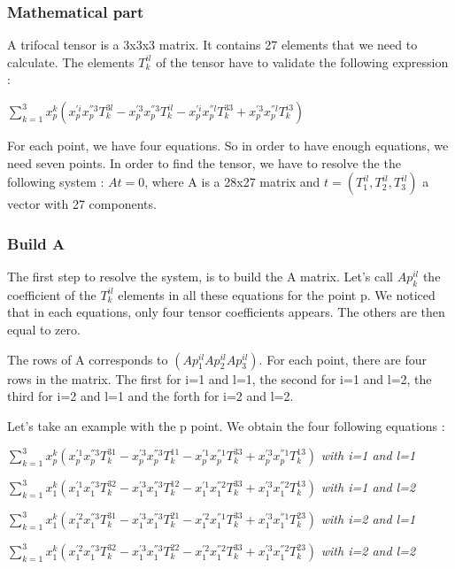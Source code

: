 \documentclass{report}
\begin{document}
\subsubsection{Mathematical part}
A trifocal tensor is a 3x3x3 matrix. It contains 27 elements that we need to calculate. The elements $T_{k}^{il}$ of the tensor have to validate the following expression : 
\begin{center}
 $ \displaystyle { \sum_{k = 1}^{3}} x_{p}^{k}(x_{p}^{'i}x_{p}^{''3}T_{k}^{3l} - x_{p}^{'3}x_{p}^{''3}T_{k}^{il} - x_{p}^{'i}x_{p}^{''l}T_{k}^{33} + x_{p}^{'3}x_{p}^{''l}T_{k}^{i3})$ 
\end{center}
For each point, we have four equations. So in order to have enough equations, we need seven points. 
In order to find the tensor, we have to resolve the the following system : $At = 0$, where A is a 28x27 matrix and $t = ( T_{1}^{il}, T_{2}^{il}, T_{3}^{il})$ a vector with 27 components.

\subsubsection{Build A}
The first step to resolve the system, is to build the A matrix. Let's call $Ap_{k}^{il}$ the coefficient of the $T_{k}^{il}$ elements in all these equations for the point p. We noticed that in each equations, only four tensor coefficients appears. The others are then equal to zero. 

The rows of A corresponds to $( Ap_{1}^{il}  Ap_{2}^{il}  Ap_{3}^{il} )$.
For each point, there are four rows in the matrix. The first for i=1 and l=1, the second for i=1 and l=2, the third for i=2 and l=1 and the forth for i=2 and l=2.


Let's take an example with the p point. 
We obtain the four following equations : 
\begin{center}
 $ \displaystyle { \sum_{k = 1}^{3}} x_{p}^{k}(x_{p}^{'1}x_{p}^{''3}T_{k}^{31} - x_{p}^{'3}x_{p}^{''3}T_{k}^{11} - x_{p}^{'1}x_{p}^{''1}T_{k}^{33} + x_{p}^{'3}x_{p}^{''1}T_{k}^{13})$  \textit{with i=1 and l=1}
\end{center}
\begin{center}
 $ \displaystyle { \sum_{k = 1}^{3}} x_{1}^{k}(x_{1}^{'1}x_{1}^{''3}T_{k}^{32} - x_{1}^{'3}x_{1}^{''3}T_{k}^{12} - x_{1}^{'1}x_{1}^{''2}T_{k}^{33} + x_{1}^{'3}x_{1}^{''2}T_{k}^{13})$  \textit{with i=1 and l=2} 
\end{center}
\begin{center}
 $ \displaystyle { \sum_{k = 1}^{3}} x_{1}^{k}(x_{1}^{'2}x_{1}^{''3}T_{k}^{31} - x_{1}^{'3}x_{1}^{''3}T_{k}^{21} - x_{1}^{'2}x_{1}^{''1}T_{k}^{33} + x_{1}^{'3}x_{1}^{''1}T_{k}^{23})$  \textit{with i=2 and l=1} 
\end{center}
\begin{center}
 $ \displaystyle { \sum_{k = 1}^{3}} x_{1}^{k}(x_{1}^{'2}x_{1}^{''3}T_{k}^{32} - x_{1}^{'3}x_{1}^{''3}T_{k}^{22} - x_{1}^{'2}x_{1}^{''2}T_{k}^{33} + x_{1}^{'3}x_{1}^{''2}T_{k}^{23})$  \textit{with i=2 and l=2} 
\end{center}
\end{document}
